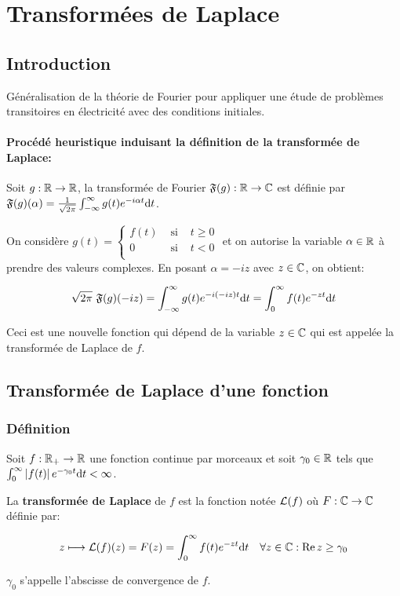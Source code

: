 \chapter{Transformées de Laplace}


\section{Introduction}

\begin{motivation}
    Généralisation de la théorie de Fourier pour appliquer une étude de problèmes transitoires en électricité avec des conditions initiales.
\end{motivation}

\subsubsection*{Procédé heuristique induisant la définition de la transformée de Laplace:}

Soit $g: \mathbb{R} \rightarrow \mathbb{R}$, la transformée de Fourier $\mathfrak{F} (g): \mathbb{R} \rightarrow \mathbb{C}$ est définie par $\mathfrak{F}(g)(\alpha) = \frac{1}{\sqrt{2 \pi}} \int_{-\infty}^{\infty} g(t) e^{-i\alpha t} \mathrm{d}t$.

On considère $g(t) = \left\{
\begin{array}{lcl}
f(t) & \textrm{ si } & t \geq 0\\
0    & \textrm{ si } & t < 0\\
\end{array}
\right.$ et on autorise la variable $\alpha \in \mathbb{R}$ à prendre des valeurs complexes.
En posant $\alpha = -i z$ avec $z \in \mathbb{C}$, on obtient:

\[ \sqrt{2\pi} \ \mathfrak{F}(g)(-iz) = \int_{-\infty}^{\infty} g(t) e^{-i(-iz)t} \mathrm{d}t = \int_{0}^{\infty} f(t) e^{-zt} \mathrm{d}t \]

Ceci est une nouvelle fonction qui dépend de la variable $z \in \mathbb{C}$ qui est appelée la transformée de Laplace de $f$.

\section{Transformée de Laplace d'une fonction}

\subsection{Définition}

\begin{definition}[16.1, p.119]
    Soit $f: \mathbb{R}_+ \rightarrow \mathbb{R}$ une fonction continue par morceaux et soit $\gamma_0 \in \mathbb{R}$ tels que $\int_0^\infty \left|f(t)\right| e^{-\gamma_0 t} \mathrm{d}t < \infty$.
    
    La \textbf{transformée de Laplace} de $f$ est la fonction notée $\mathcal{L}(f)$ où $F: \mathbb{C} \rightarrow \mathbb{C}$ définie par:
    
    \[ z \longmapsto \mathcal{L}(f)(z) = F(z) = \int_0^\infty f(t) e^{-zt} \mathrm{d}t \quad \forall z \in \mathbb{C} : \operatorname{Re} z \geq \gamma_0 \]
    
    $\gamma_0$ s'appelle l'abscisse de convergence de $f$.
\end{definition}

